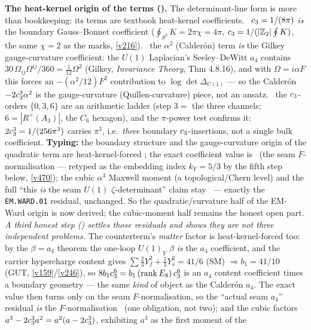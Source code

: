 \par\smallskip
\noindent\textbf{The heat-kernel origin of the terms ().} The determinant-line
form is more than bookkeeping: its terms are textbook heat-kernel coefficients. \mE\ $c_3=1/(8\pi)$ \emph{is}
the boundary Gauss--Bonnet coefficient ($\oint_{S^2}K=2\pi\chi=4\pi$, $c_3=1/(|\mathbb{Z}_2|\oint K)$, the same
$\chi{=}2$ as the marks, \vref{v216}). \mE\ the $\alpha^2$ (Calder\'on) term \emph{is} the Gilkey gauge-curvature
coefficient: the $U(1)$ Laplacian's Seeley--DeWitt $a_4$ contains $30\,\Omega_{ij}\Omega^{ij}/360=\tfrac1{12}\Omega^2$
(Gilkey, \emph{Invariance Theory}, Thm 4.8.16), and with $\Omega=i\alpha F$ this forces an $-(\alpha^2/12)F^2$
contribution to $\log\det\Delta_{U(1)}$ --- so the Calder\'on $-2c_3^3\alpha^2$ is the gauge-curvature
(Quillen-curvature) piece, not an ansatz. \mE\ the $c_3$-orders $\{0,3,6\}$ are an arithmetic ladder (step $3=$
the three channels; $6=|R^+(A_3)|$, the $C_6$ hexagon), and the $\pi$-power test confirms it: $2c_3^3=1/(256\pi^3)$
carries $\pi^3$, i.e.\ \emph{three} boundary $c_3$-insertions, not a single bulk coefficient. \textbf{Typing:} the
boundary structure and the gauge-curvature origin of the quadratic term are heat-kernel-forced \mE; the exact
coefficient value is \mC\ (the seam $F$-normalisation --- retyped as the embedding index $k_Y{=}5/3$ by the
fifth step below, \vref{v470}); the cubic $\alpha^3$ Maxwell moment (a topological/Chern
level) and the full ``this \emph{is} the seam $U(1)$ $\zeta$-determinant'' claim stay \mO\ --- exactly the
\texttt{EM.WARD.01} residual, unchanged. So the quadratic/curvature half of the EM-Ward origin is now derived; the
cubic-moment half remains the honest open part.
\emph{A third honest step () settles those residuals and shows they are
not three independent problems.} The counterterm's \emph{matter} factor is heat-kernel-forced too: by the
$\beta=a_4$ theorem the one-loop $U(1)_Y$ $\beta$ \emph{is} the $a_4$ coefficient, and the carrier hypercharge
content gives $\sum\tfrac23 Y_f^2+\tfrac13 Y_s^2=41/6$ (SM) $\Rightarrow b_1=41/10$ (GUT, \vref{v159}/\vref{v246}),
so $8b_1c_3^6=b_1\,(\operatorname{rank}E_8)\,c_3^6$ is an $a_4$ content coefficient times a boundary
geometry --- the same \emph{kind} of object as the Calder\'on $a_4$. The exact value then turns only on the seam
$F$-normalisation, so the ``actual seam $a_4$'' residual \emph{is} the $F$-normalisation \mC\ (one obligation, not
two); and the cubic factors $a^3-2c_3^3 a^2=a^2(a-2c_3^3)$, exhibiting $a^3$ as the first moment of the
